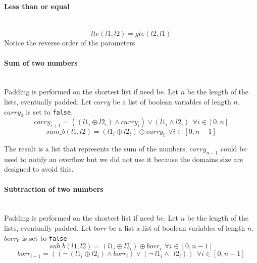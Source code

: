   \paragraph*{Less than or equal} \hfill \\
    \begin{equation*}
      lte(l1, l2) = gte(l2, l1) %
    \end{equation*}
    Notice the reverse order of the parameters\\

  \paragraph*{Sum of two numbers} \hfill \\
    Padding is performed on the shortest list if need be.
    Let \(n\)  be the length of the lists, eventually padded. Let \(carry\)  be a list of boolean
    variables of length \(n\). \(carry_0\)  is set to \texttt{false}.  
    \begin{equation*}
      carry_{i+1} = ((l1_i \oplus l2_i) \land carry_i) \lor (l1_i \land l2_i) \ \ \forall i \in [0, n]
    \end{equation*}
    \begin{equation*}
      sum\_b(l1, l2) = (l1_i \oplus l2_i) \oplus carry_i \  \ \forall i \in [0, n-1]
  \end{equation*}

  The result is a list that represents the sum of the numbers. \(carry_{n-1}\)  could be used to
  notify an overflow but we did  not use it because the domains size are designed to avoid this.\\

\paragraph*{Subtraction of two numbers} \hfill \\
  Padding is performed on the shortest list if need be.
  Let \(n\)  be the length of the lists, eventually padded.
  Let \(borr\)  be a list a list of boolean variables of length \(n\). \(borr_0\)  is set to \texttt{false} 
  \begin{equation*}
    sub\_b(l1, l2) = (l1_i \oplus l2_i) \oplus borr_i \ \ \forall i \in [0, n-1]
  \end{equation*}
  \begin{equation*}
    borr_{i+1} = ((\neg \ (l1_i \oplus l2_i) \land borr_i) \lor (\neg \ l1_i \land \ \ l2_i)) \ \ 
      \forall i \in [0, n-1]
  \end{equation*}

